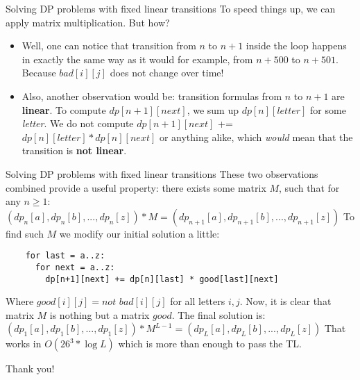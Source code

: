 \documentclass{beamer}
\begin{document}
\begin{frame}[fragile]{Solving DP problems with fixed linear transitions}
  To speed things up, we can apply matrix multiplication. But how?
  \pause \newline
  \begin{itemize}
    \item 
      Well, one can notice that transition from $n$ to $n + 1$ inside the loop
      happens in exactly the same way as it would for example, from $n + 500$ to $n + 501$.
      \newline Because $bad[i][j]$ does not change over time!
  \pause \newline
    \item
      Also, another observation would be: 
      transition formulas from $n$ to $n + 1$ are \textbf{linear}.
      To compute $dp[n + 1][next]$, we sum up $dp[n][letter]$
      for some \textit{letter}.
      \newline 
      We do not compute
      $dp[n + 1][next]$ += $dp[n][letter] * dp[n][next]$ or anything alike,
      which \textit{would} mean that the transition is \textbf{not linear}.
  \end{itemize}
\end{frame}

\begin{frame}[fragile]{Solving DP problems with fixed linear transitions}
  These two observations combined provide a useful property: 
  \newline
  there exists some matrix $M$, such that for any $n \geq 1$:
  $(dp_n[a], dp_n[b], ..., dp_n[z]) * M = (dp_{n+1}[a], dp_{n+1}[b], ..., dp_{n+1}[z])$
  \pause \newline
  To find such $M$ we modify our initial solution a little:
  \begin{lstlisting}
    for last = a..z:
      for next = a..z:
        dp[n+1][next] += dp[n][last] * good[last][next]
  \end{lstlisting}
  Where $good[i][j] = not$ $bad[i][j]$ for all letters $i,j$.
  \pause \newline
  Now, it is clear that matrix $M$ is nothing but a matrix $good$.
  \pause \newline
  The final solution is: 
  \newline 
  $(dp_1[a], dp_1[b], ..., dp_1[z]) * M^{L-1} = (dp_L[a], dp_L[b], ..., dp_L[z])$
  \newline That works in $O(26^3 * \log{L})$ which is more than enough to pass the TL.
\end{frame}

\begin{frame}{}
                \LARGE{\centerline{Thank you!}}
\end{frame}
\end{document}
